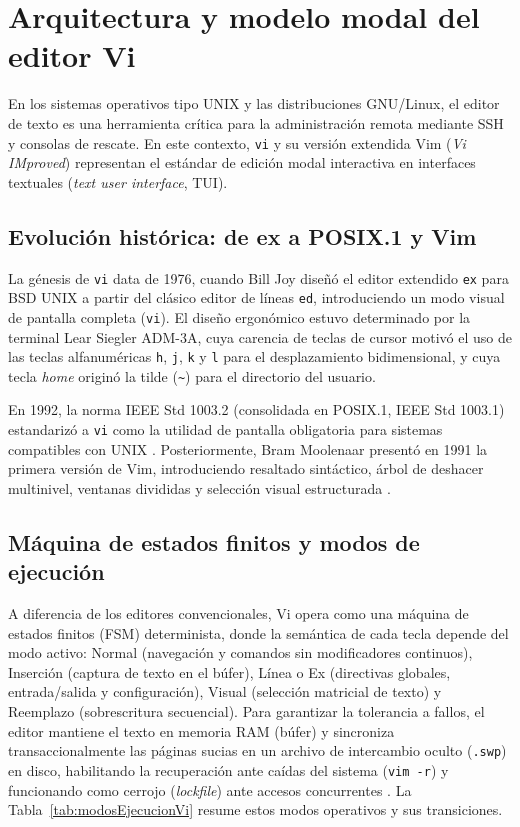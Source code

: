 \documentclass[12pt]{article}
\begin{document}
\section{Arquitectura y modelo modal del editor Vi}
\label{sec:arquitecturaModeloVi}

En los sistemas operativos tipo UNIX y las distribuciones GNU/Linux, el editor de texto es una herramienta crítica para la administración remota mediante SSH y consolas de rescate. En este contexto, \texttt{vi} y su versión extendida Vim (\textit{Vi IMproved}) representan el estándar de edición modal interactiva en interfaces textuales (\textit{text user interface}, TUI).

\subsection{Evolución histórica: de ex a POSIX.1 y Vim}
\label{subsec:evolucionHistoricaVi}

La génesis de \texttt{vi} data de 1976, cuando Bill Joy diseñó el editor extendido \texttt{ex} para BSD UNIX a partir del clásico editor de líneas \texttt{ed}, introduciendo un modo visual de pantalla completa (\texttt{vi}). El diseño ergonómico estuvo determinado por la terminal Lear Siegler ADM-3A, cuya carencia de teclas de cursor motivó el uso de las teclas alfanuméricas \texttt{h}, \texttt{j}, \texttt{k} y \texttt{l} para el desplazamiento bidimensional, y cuya tecla \textit{home} originó la tilde (\texttt{\textasciitilde}) para el directorio del usuario.

En 1992, la norma IEEE Std 1003.2 (consolidada en POSIX.1, IEEE Std 1003.1) estandarizó a \texttt{vi} como la utilidad de pantalla obligatoria para sistemas compatibles con UNIX \parencite{ieee2018posixvi}. Posteriormente, Bram Moolenaar presentó en 1991 la primera versión de Vim, introduciendo resaltado sintáctico, árbol de deshacer multinivel, ventanas divididas y selección visual estructurada \parencite{oualline2001vim, moolenaar2024vim}.

\subsection{Máquina de estados finitos y modos de ejecución}
\label{subsec:maquinaEstadosVi}

A diferencia de los editores convencionales, Vi opera como una máquina de estados finitos (FSM) determinista, donde la semántica de cada tecla depende del modo activo: Normal (navegación y comandos sin modificadores continuos), Inserción (captura de texto en el búfer), Línea o Ex (directivas globales, entrada/salida y configuración), Visual (selección matricial de texto) y Reemplazo (sobrescritura secuencial). Para garantizar la tolerancia a fallos, el editor mantiene el texto en memoria RAM (búfer) y sincroniza transaccionalmente las páginas sucias en un archivo de intercambio oculto (\texttt{.swp}) en disco, habilitando la recuperación ante caídas del sistema (\texttt{vim -r}) y funcionando como cerrojo (\textit{lockfile}) ante accesos concurrentes \parencite{oualline2001vim}. La Tabla~\ref{tab:modosEjecucionVi} resume estos modos operativos y sus transiciones.
\end{document}
